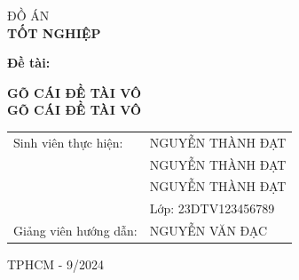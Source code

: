 \begin{titlepage}
\begin{center}
\fontsize{24pt}{0pt}\selectfont ĐỒ ÁN \\
\vspace{12pt}
\textbf{\fontsize{32pt}{0pt}\selectfont TỐT NGHIỆP   }
\end{center}
\vspace{1cm}
\hspace{6pt}\textbf{\fontsize{14pt}{0pt}\selectfont Đề tài:}
\begin{center}
    \textbf{\fontsize{20pt}{0pt}\selectfont GÕ CÁI ĐỀ TÀI VÔ}\\
    \textbf{\fontsize{20pt}{0pt}\selectfont GÕ CÁI ĐỀ TÀI VÔ}
\end{center}
\vspace{1cm}
\begin{table}[H]
    \centering
    \begin{tabular}{l l}
       \fontsize{14pt}{0pt}\selectfont Sinh viên thực hiện: &  \fontsize{14pt}{0pt}\selectfont NGUYỄN THÀNH ĐẠT \\
         & \fontsize{14pt}{0pt}\selectfont NGUYỄN THÀNH ĐẠT\\
         & \fontsize{14pt}{0pt}\selectfont NGUYỄN THÀNH ĐẠT\\
         & \fontsize{14pt}{0pt}\selectfont Lớp: 23DTV123456789\\
        \fontsize{14pt}{0pt}\selectfont Giảng viên hướng dẫn: & \fontsize{14pt}{0pt}\selectfont NGUYỄN VĂN ĐẠC 
    \end{tabular}
\end{table}
\vspace{3cm}
\begin{center}
    \fontsize{14pt}{0pt}\selectfont TPHCM - 9/2024
\end{center}
\end{titlepage}
